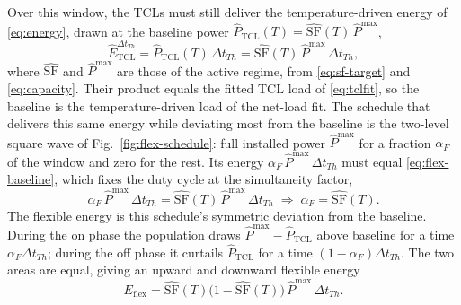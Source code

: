 Over this window, the TCLs must still deliver the temperature-driven energy of \eqref{eq:energy}, drawn at the baseline power $\hat{P}_{\mathrm{TCL}}(T) = \hat{\mathrm{SF}}(T)\,\hat{P}^{\max}$,
\begin{equation}
\hat{E}_{\mathrm{TCL}}^{\Delta t_{Th}} = \hat{P}_{\mathrm{TCL}}(T)\,\Delta t_{Th} = \hat{\mathrm{SF}}(T)\,\hat{P}^{\max}\,\Delta t_{Th},
\label{eq:flex-baseline}
\end{equation}
where $\hat{\mathrm{SF}}$ and $\hat{P}^{\max}$ are those of the active regime, from \eqref{eq:sf-target} and \eqref{eq:capacity}. Their product equals the fitted TCL load of \eqref{eq:tclfit}, so the baseline is the temperature-driven load of the net-load fit. The schedule that delivers this same energy while deviating most from the baseline is the two-level square wave of Fig.~\ref{fig:flex-schedule}: full installed power $\hat{P}^{\max}$ for a fraction $\alpha_F$ of the window and zero for the rest. Its energy $\alpha_F\,\hat{P}^{\max}\,\Delta t_{Th}$ must equal \eqref{eq:flex-baseline}, which fixes the duty cycle at the simultaneity factor,
\begin{equation}
\alpha_F\,\hat{P}^{\max}\,\Delta t_{Th} = \hat{\mathrm{SF}}(T)\,\hat{P}^{\max}\,\Delta t_{Th} \;\Longrightarrow\; \alpha_F = \hat{\mathrm{SF}}(T).
\label{eq:flex-duty}
\end{equation}
The flexible energy is this schedule's symmetric deviation from the baseline. During the on phase the population draws $\hat{P}^{\max} - \hat{P}_{\mathrm{TCL}}$ above baseline for a time $\alpha_F \Delta t_{Th}$; during the off phase it curtails $\hat{P}_{\mathrm{TCL}}$ for a time $(1 - \alpha_F)\Delta t_{Th}$. The two areas are equal, giving an upward and downward flexible energy
\begin{equation}
E_{\mathrm{flex}} = \hat{\mathrm{SF}}(T)\big(1 - \hat{\mathrm{SF}}(T)\big)\,\hat{P}^{\max}\,\Delta t_{Th}.
\label{eq:flex-energy}
\end{equation}

